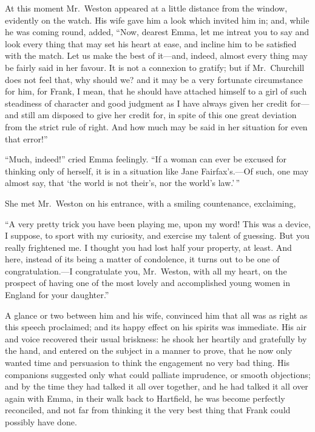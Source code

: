 At this moment Mr.\ Weston appeared at a little distance from the window,
evidently on the watch.  His wife gave him a look which invited
him in; and, while he was coming round, added, ``Now, dearest Emma,
let me intreat you to say and look every thing that may set his
heart at ease, and incline him to be satisfied with the match.
Let us make the best of it---and, indeed, almost every thing may
be fairly said in her favour.  It is not a connexion to gratify;
but if Mr.\ Churchill does not feel that, why should we? and it
may be a very fortunate circumstance for him, for Frank, I mean,
that he should have attached himself to a girl of such steadiness
of character and good judgment as I have always given her credit for---%
and still am disposed to give her credit for, in spite of this
one great deviation from the strict rule of right.  And how much
may be said in her situation for even that error!''

``Much, indeed!'' cried Emma feelingly.  ``If a woman can ever
be excused for thinking only of herself, it is in a situation
like Jane Fairfax's.---Of such, one may almost say, that `the
world is not their's, nor the world's law.'\,''

She met Mr.\ Weston on his entrance, with a smiling countenance,
exclaiming,

``A very pretty trick you have been playing me, upon my word!
This was a device, I suppose, to sport with my curiosity,
and exercise my talent of guessing.  But you really frightened me.
I thought you had lost half your property, at least.  And here,
instead of its being a matter of condolence, it turns out to be one
of congratulation.---I congratulate you, Mr.\ Weston, with all my heart,
on the prospect of having one of the most lovely and accomplished
young women in England for your daughter.''

A glance or two between him and his wife, convinced him that all was
as right as this speech proclaimed; and its happy effect on his spirits
was immediate.  His air and voice recovered their usual briskness:
he shook her heartily and gratefully by the hand, and entered
on the subject in a manner to prove, that he now only wanted
time and persuasion to think the engagement no very bad thing.
His companions suggested only what could palliate imprudence,
or smooth objections; and by the time they had talked it all
over together, and he had talked it all over again with Emma,
in their walk back to Hartfield, he was become perfectly reconciled,
and not far from thinking it the very best thing that Frank could
possibly have done.



